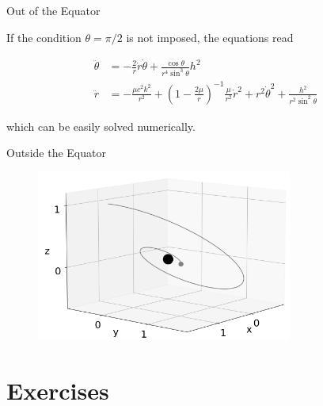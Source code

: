 \documentclass[xcolor=dvipsnames]{beamer}
\begin{document}
\begin{frame}{Out of the Equator}

If the condition $\theta = \pi/2$ is not imposed, the equations read

\begin{block}{}
\begin{align*}
\ddot{\theta} &= -\frac{2}{r} \dot{r} \dot{\theta} + \frac{\cos \theta}{r^4 \sin^3 \theta} h^2  \\
\ddot{r} &= -\frac{\mu c^2 k^2}{r^2} + \left( 1 - \frac{2\mu}{r}\right)^{-1} \frac{\mu}{r^2}\dot{r}^2 + r^2 \dot{\theta}^2 + \frac{h^2}{r^2 \sin^2 \theta} 
\end{align*}
\end{block}

which can be easily solved numerically.

\end{frame}



\begin{frame}{Outside the Equator}

\begin{figure}[h!]
   \centering
   \includegraphics[width=0.75\textwidth]{Presentations/Images/2_gen_obit1.png}
\end{figure}

\end{frame}



\section{Exercises}
\end{document}
